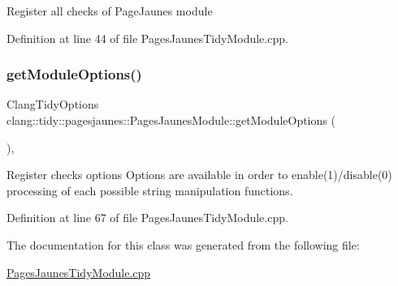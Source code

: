 Register all checks of Page\+Jaunes module 

Definition at line 44 of file Pages\+Jaunes\+Tidy\+Module.\+cpp.

\mbox{\label{classclang_1_1tidy_1_1pagesjaunes_1_1_pages_jaunes_module_af2eb38da2b6636a14766478530b4aa17}} 
\subsubsection{\texorpdfstring{get\+Module\+Options()}{getModuleOptions()}}
{\footnotesize\ttfamily Clang\+Tidy\+Options clang\+::tidy\+::pagesjaunes\+::\+Pages\+Jaunes\+Module\+::get\+Module\+Options (\begin{DoxyParamCaption}{ }\end{DoxyParamCaption})\hspace{0.3cm}{\ttfamily [inline]}, {\ttfamily [override]}}

Register checks options Options are available in order to enable(1)/disable(0) processing of each possible string manipulation functions.

Definition at line 67 of file Pages\+Jaunes\+Tidy\+Module.\+cpp.



The documentation for this class was generated from the following file\+:\begin{DoxyCompactItemize}
\item 
\hyperlink{_pages_jaunes_tidy_module_8cpp}{Pages\+Jaunes\+Tidy\+Module.\+cpp}\end{DoxyCompactItemize}
